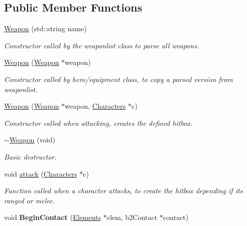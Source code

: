 \subsection*{Public Member Functions}
\begin{DoxyCompactItemize}
\item 
\hyperlink{class_weapon_a7267e890fa563b4f2df8746f443b461a}{Weapon} (std\-::string name)
\begin{DoxyCompactList}\small\item\em Constructor called by the weaponlist class to parse all weapons. \end{DoxyCompactList}\item 
\hyperlink{class_weapon_a559c41dbcc415a6ee70112f5231ef83b}{Weapon} (\hyperlink{class_weapon}{Weapon} $\ast$weapon)
\begin{DoxyCompactList}\small\item\em Constructor called by hero/equipment class, to copy a parsed version from weaponlist. \end{DoxyCompactList}\item 
\hyperlink{class_weapon_aa3eb21f28f64908763402004fa802b36}{Weapon} (\hyperlink{class_weapon}{Weapon} $\ast$weapon, \hyperlink{class_characters}{Characters} $\ast$c)
\begin{DoxyCompactList}\small\item\em Constructor called when attacking, creates the defined hitbox. \end{DoxyCompactList}\item 
\hypertarget{class_weapon_aa3364fb5092bbdb4c215e02dd1494f10}{\hyperlink{class_weapon_aa3364fb5092bbdb4c215e02dd1494f10}{$\sim$\-Weapon} (void)}\label{class_weapon_aa3364fb5092bbdb4c215e02dd1494f10}

\begin{DoxyCompactList}\small\item\em Basic destructor. \end{DoxyCompactList}\item 
void \hyperlink{class_weapon_a90b2b26acbbfc87a14786c8859e4a01d}{attack} (\hyperlink{class_characters}{Characters} $\ast$c)
\begin{DoxyCompactList}\small\item\em Function called when a character attacks, to create the hitbox depending if its ranged or melee. \end{DoxyCompactList}\item 
\hypertarget{class_weapon_a866884395ed4c0e7a972bb18e8d7d030}{void {\bfseries Begin\-Contact} (\hyperlink{class_elements}{Elements} $\ast$elem, b2\-Contact $\ast$contact)}\label{class_weapon_a866884395ed4c0e7a972bb18e8d7d030}


\end{DoxyCompactItemize}
